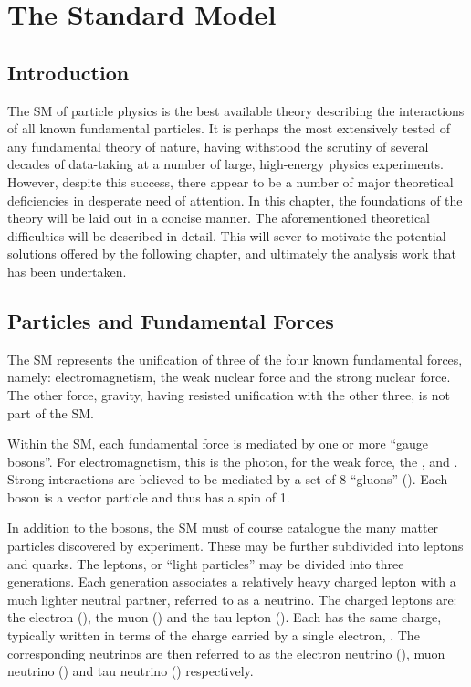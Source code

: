 \chapter{The Standard Model}
\label{sec:sm}
\section{Introduction}
The \acl{SM} of particle physics is the best available theory describing the
interactions of all known fundamental particles. It is perhaps the most
extensively tested of any fundamental theory of nature, having withstood the
scrutiny of several decades of data-taking at a number of large, high-energy
physics experiments. However, despite this success, there appear to be a number
of major theoretical deficiencies in desperate need of attention. In this
chapter, the foundations of the theory will be laid out in a concise
manner. The aforementioned theoretical difficulties will be described in
detail. This will sever to motivate the potential solutions offered by the
following chapter, and ultimately the analysis work that has been undertaken.

\section{Particles and Fundamental Forces}
The \ac{SM} represents the unification of three of the four known fundamental
forces, namely: electromagnetism, the weak nuclear force and the strong nuclear
force. The other force, gravity, having resisted unification with the other
three, is not part of the \ac{SM}.

Within the \ac{SM}, each fundamental force is mediated by one or more ``gauge
bosons''. For electromagnetism, this is the photon, for the weak force, the
\PWp, \PWm and \PZ. Strong interactions are believed to be mediated by a set of
8 ``gluons'' (\Pg). Each boson is a vector particle and thus has a spin of 1.

In addition to the bosons, the \ac{SM} must of course catalogue the many matter
particles discovered by experiment. These may be further subdivided into leptons
and quarks. The leptons, or ``light particles'' may be divided into three
generations. Each generation associates a relatively heavy charged lepton with a
much lighter neutral partner, referred to as a neutrino. The charged leptons
are: the electron (\Pe), the muon (\Pgm) and the tau lepton (\Ptau). Each has the
same charge, typically written in terms of the charge carried by a single
electron, \ec. The corresponding neutrinos are then referred to as the electron
neutrino (\Pnue), muon neutrino (\Pnum) and tau neutrino (\Pnut) respectively.

